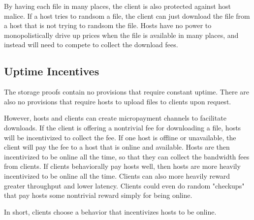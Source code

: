 \documentclass[twocolumn]{article}
\begin{document}
By having each file in many places, the client is also protected against host malice.
If a host tries to randsom a file, the client can just download the file from a host that is not trying to randsom the file.
Hosts have no power to monopolistically drive up prices when the file is available in many places, and instead will need to compete to collect the download fees.

\subsection{Uptime Incentives}
The storage proofs contain no provisions that require constant uptime.
There are also no provisions that require hosts to upload files to clients upon request.

However, hosts and clients can create micropayment channels to facilitate downloads.
If the client is offering a nontrivial fee for downloading a file, hosts will be incentivized to collect the fee.
If one host is offline or unavailable, the client will pay the fee to a host that is online and available.
Hosts are then incentivized to be online all the time, so that they can collect the bandwidth fees from clients.
If clients behaviorally pay hosts well, then hosts are more heavily incentivized to be online all the time.
Clients can also more heavily reward greater throughput and lower latency.
Clients could even do random "checkups" that pay hosts some nontrivial reward simply for being online.

In short, clients choose a behavior that incentivizes hosts to be online.


\end{document}
